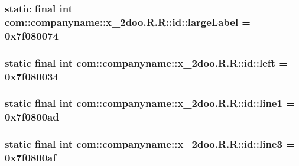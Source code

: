 \hypertarget{classcom_1_1companyname_1_1x__2doo_1_1_r_1_1id_7757b73c6978a3370a338bb609321a4f}{
\subsubsection[{largeLabel}]{\setlength{\rightskip}{0pt plus 5cm}static final int com::companyname::x\_\-2doo.R.R::id::largeLabel = 0x7f080074}}
\label{classcom_1_1companyname_1_1x__2doo_1_1_r_1_1id_7757b73c6978a3370a338bb609321a4f}


\hypertarget{classcom_1_1companyname_1_1x__2doo_1_1_r_1_1id_e74c5a7f6077cf18e1eec40c1b0e27fd}{
\subsubsection[{left}]{\setlength{\rightskip}{0pt plus 5cm}static final int com::companyname::x\_\-2doo.R.R::id::left = 0x7f080034}}
\label{classcom_1_1companyname_1_1x__2doo_1_1_r_1_1id_e74c5a7f6077cf18e1eec40c1b0e27fd}


\hypertarget{classcom_1_1companyname_1_1x__2doo_1_1_r_1_1id_0adf0d3e15c546a64c4a886fc14edc58}{
\subsubsection[{line1}]{\setlength{\rightskip}{0pt plus 5cm}static final int com::companyname::x\_\-2doo.R.R::id::line1 = 0x7f0800ad}}
\label{classcom_1_1companyname_1_1x__2doo_1_1_r_1_1id_0adf0d3e15c546a64c4a886fc14edc58}


\hypertarget{classcom_1_1companyname_1_1x__2doo_1_1_r_1_1id_aa1a7bf14a8fcbd5eba36b4589d307c8}{
\subsubsection[{line3}]{\setlength{\rightskip}{0pt plus 5cm}static final int com::companyname::x\_\-2doo.R.R::id::line3 = 0x7f0800af}}
\label{classcom_1_1companyname_1_1x__2doo_1_1_r_1_1id_aa1a7bf14a8fcbd5eba36b4589d307c8}


